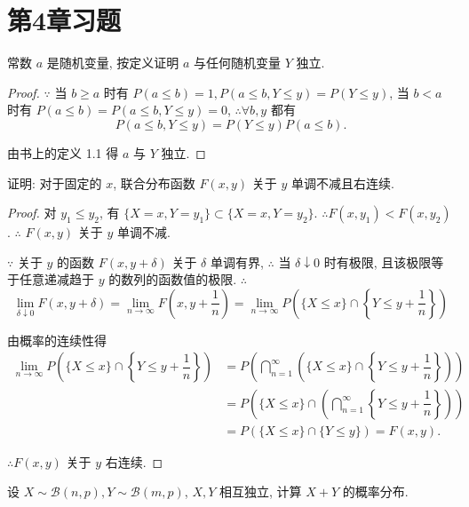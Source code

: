 \documentclass{ctexart}
\begin{document}
\section{第4章习题}
\addtocounter{exsection}{4}
\addtocounter{exercise}{3}
\begin{exercise}%
    常数 $a$ 是随机变量, 按定义证明 $a$ 与任何随机变量 $Y$ 独立.
\end{exercise}
\begin{proof}
    $\because$ 当 $b\geq a$ 时有 $P(a\leq b)=1,P(a\leq b,Y\leq y)=P(Y\leq y)$, 当 $b<a$ 时有 $P(a\leq b)=P(a\leq b,Y\leq y)=0$, $\therefore\forall b,y$ 都有
    \[P(a\leq b,Y\leq y)=P(Y\leq y)P(a\leq b).\]

    由书上的定义 1.1 得 $a$ 与 $Y$ 独立.
\end{proof}
\begin{exercise}%
    证明: 对于固定的 $x$, 联合分布函数 $F(x,y)$ 关于 $y$ 单调不减且右连续.
\end{exercise}
\begin{proof}
    对 $y_1\leq y_2$, 有 $\{X=x,Y=y_1\}\subset\{X=x,Y=y_2\}$. $\therefore F(x,y_1)<F(x,y_2)$. $\therefore$ $F(x,y)$ 关于 $y$ 单调不减.

    $\because$ 关于 $y$ 的函数 $F(x,y+\delta)$ 关于 $\delta$ 单调有界, $\therefore$ 当 $\delta\downarrow0$ 时有极限, 且该极限等于任意递减趋于 $y$ 的数列的函数值的极限. $\therefore$
    \[\lim\limits_{\delta\downarrow0}F(x,y+\delta)=\lim\limits_{n\to\infty}F\left(x,y+\dfrac{1}{n}\right)=\lim\limits_{n\to\infty}P\left(\{X\leq x\}\cap\left\{Y\leq y+\dfrac{1}{n}\right\}\right)\]

    由概率的连续性得
    \begin{align*}
        \lim\limits_{n\to\infty}P\left(\{X\leq x\}\cap\left\{Y\leq y+\dfrac{1}{n}\right\}\right) & =P\left(\bigcap\limits_{n=1}^\infty\left(\{X\leq x\}\cap\left\{Y\leq y+\dfrac{1}{n}\right\}\right)\right) \\
        & =P\left(\{X\leq x\}\cap\left(\bigcap\limits_{n=1}^\infty\left\{Y\leq y+\dfrac{1}{n}\right\}\right)\right) \\
        & =P(\{X\leq x\}\cap\{Y\leq y\})=F(x,y).
    \end{align*}

    $\therefore F(x,y)$ 关于 $y$ 右连续.
\end{proof}
\begin{exercise}%
    设 $X\sim\mathcal{B}(n,p),Y\sim\mathcal{B}(m,p)$, $X,Y$ 相互独立, 计算 $X+Y$ 的概率分布.
\end{exercise}
\end{document}
